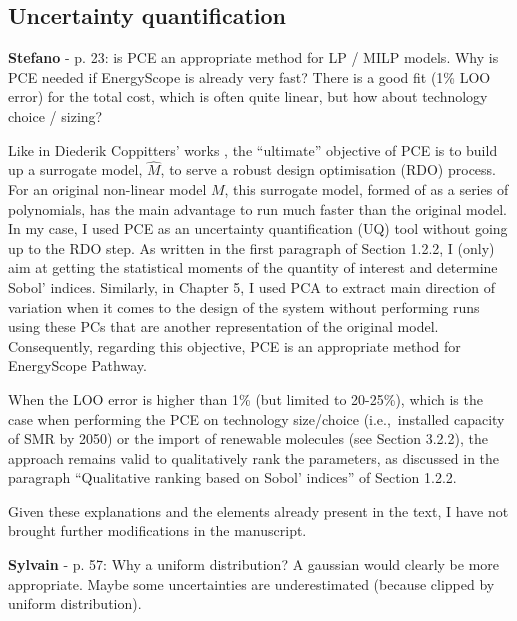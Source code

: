 \documentclass[12pt,a4paper]{article}
\def\ie{i.e.,\ }
\begin{document}
\subsection{Uncertainty quantification}
\label{methodo_UQ}

\begin{mdframed}[style=comment] %
{\color{orange} \textbf{Stefano}} - p. 23: is PCE an appropriate method for LP / MILP models. Why is PCE needed if EnergyScope is already very fast? There is a good fit (1\% LOO error) for the total cost, which is often quite linear, but how about technology choice / sizing?
\end{mdframed}

\noindent Like in Diederik Coppitters' works \cite{coppitters2021robust,coppittersthesis}, the ``ultimate'' objective of PCE is to build up a surrogate model, $\hat{M}$, to serve a robust design optimisation (RDO) process. For an original non-linear model $M$, this surrogate model, formed of as a series of polynomials,  has the main advantage to run much faster than the original model. In my case, I used PCE as an uncertainty quantification (UQ) tool without going up to the RDO step. As written {\color{blue}in the first paragraph of Section 1.2.2}, I (only) aim at getting the statistical moments of the quantity of interest and determine Sobol' indices. Similarly, in Chapter 5, I used PCA to extract main direction of variation when it comes to the design of the system without performing runs using these PCs that are another representation of the original model. Consequently, regarding this objective, PCE is an appropriate method for EnergyScope Pathway. 

\noindent When the LOO error is higher than 1\% (but limited to 20-25\%), which is the case when performing the PCE on technology size/choice (\ie installed capacity of SMR by 2050) or the import of renewable molecules (see Section 3.2.2), the approach remains valid to qualitatively rank the parameters, {\color{blue}as discussed in the paragraph ``Qualitative ranking based on Sobol' indices'' of Section 1.2.2}.

\noindent Given these explanations and the elements already present in the text, I have not brought further modifications in the manuscript.

\begin{mdframed}[style=comment] %
{\color{purple} \textbf{Sylvain}} - p. 57: Why a uniform distribution? A gaussian would clearly be more appropriate. Maybe some uncertainties are underestimated (because clipped by uniform distribution).
\end{mdframed}
\end{document}
